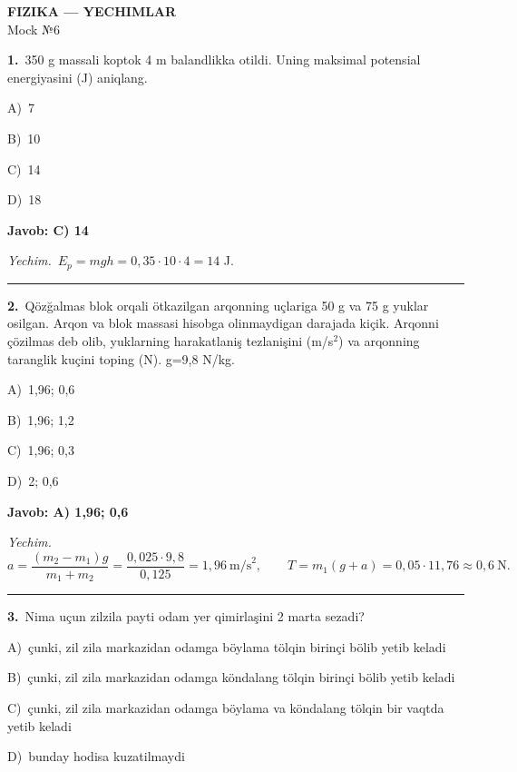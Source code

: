 \documentclass[11pt,a4paper]{article}
\newcommand{\opt}[2]{\hspace*{4mm}#1)\ #2\par}
\begin{document}
\begin{center}{\Large\textbf{FIZIKA — YECHIMLAR}}\\[2pt]{\large Mock №6}\end{center}
\noindent\begin{minipage}{\linewidth}
\textbf{1.}\ 350 g massali koptok 4 m balandlikka otildi. Uning maksimal potensial energiyasini (J) aniqlang.\par\smallskip
\opt{A}{7}
\opt{B}{10}
\opt{C}{14}
\opt{D}{18}
\end{minipage}\vspace{2pt}\par
\noindent\colorbox{gray!12}{\parbox{\dimexpr\linewidth-2\fboxsep}{\textbf{Javob: C) 14}}}\par\smallskip
\noindent\textit{Yechim.}\ $E_p=mgh=0{,}35\cdot10\cdot4=14$ J.\par\par\medskip\hrule\medskip
{}\noindent\begin{minipage}{\linewidth}
\textbf{2.}\ Qözğalmas blok orqali ötkazilgan arqonning uçlariga 50 g va 75 g yuklar osilgan. Arqon va blok massasi hisobga olinmaydigan darajada kiçik. Arqonni çözilmas deb olib, yuklarning harakatlaniş tezlanişini (m/s$^{2}$) va arqonning taranglik kuçini toping (N). g=9,8 N/kg.\par\smallskip
\opt{A}{1,96; 0,6}
\opt{B}{1,96; 1,2}
\opt{C}{1,96; 0,3}
\opt{D}{2; 0,6}
\end{minipage}\vspace{2pt}\par
\noindent\colorbox{gray!12}{\parbox{\dimexpr\linewidth-2\fboxsep}{\textbf{Javob: A) 1,96; 0,6}}}\par\smallskip
\noindent\textit{Yechim.}\ \[a=\frac{(m_2-m_1)g}{m_1+m_2}=\frac{0{,}025\cdot9{,}8}{0{,}125}=1{,}96\ \text{m/s}^2,\qquad T=m_1(g+a)=0{,}05\cdot11{,}76\approx0{,}6\ \text{N}.\]\par\medskip\hrule\medskip
{}\noindent\begin{minipage}{\linewidth}
\textbf{3.}\ Nima uçun zilzila payti odam yer qimirlaşini 2 marta sezadi?\par\smallskip
\opt{A}{çunki, zil zila markazidan odamga böylama tölqin birinçi bölib yetib keladi}
\opt{B}{çunki, zil zila markazidan odamga köndalang tölqin birinçi bölib yetib keladi}
\opt{C}{çunki, zil zila markazidan odamga böylama va köndalang tölqin bir vaqtda yetib keladi}
\opt{D}{bunday hodisa kuzatilmaydi}
\end{minipage}\vspace{2pt}\par
\end{document}
